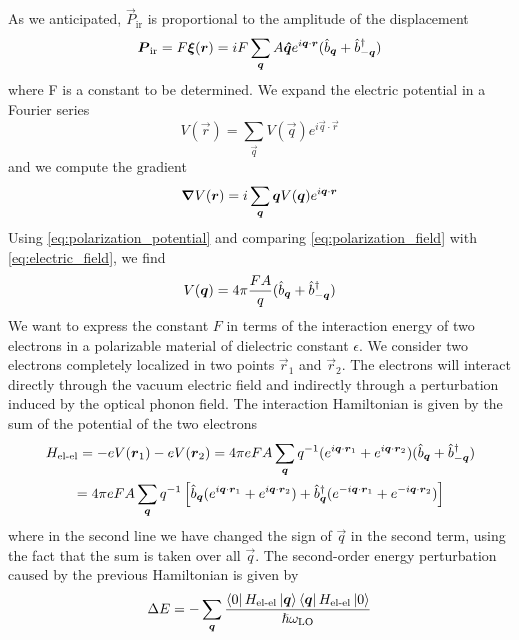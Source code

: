 As we anticipated, $\vec{P}_\text{ir}$ is proportional to the amplitude of the displacement
\begin{equation} \label{eq:polarization_field}
    \mathbf{\boldsymbol{P}}_\text{ir} = F \mathbf{\boldsymbol{\xi}}(\mathbf{\boldsymbol{r}}) = i F \sum_{\mathbf{\boldsymbol{q}}} A \mathbf{\boldsymbol{\hat{q}}} e^{i\mathbf{\boldsymbol{q}} \cdot \mathbf{\boldsymbol{r}}} (\hat{b}_{\mathbf{\boldsymbol{q}}} + \hat{b}^\dagger_{-\mathbf{\boldsymbol{q}}})
\end{equation}
where F is a constant to be determined. We expand the electric potential in a Fourier series
\begin{equation}
    V(\vec{r}) = \sum_\vec{q} V(\vec{q}) e^{i\vec{q} \cdot \vec{r}}
\end{equation}
and we compute the gradient
\begin{equation} \label{eq:electric_field}
    \grad V(\mathbf{\boldsymbol{r}}) = i \sum_{\mathbf{\boldsymbol{q}}} \mathbf{\boldsymbol{q}} V(\mathbf{\boldsymbol{q}}) e^{i\mathbf{\boldsymbol{q}} \cdot \mathbf{\boldsymbol{r}}}
\end{equation}
Using \cref{eq:polarization_potential} and comparing \cref{eq:polarization_field} with \cref{eq:electric_field}, we find
\begin{equation}
    V(\mathbf{\boldsymbol{q}}) = 4\pi \frac{F A}{q} (\hat{b}_{\mathbf{\boldsymbol{q}}} + \hat{b}^\dagger_{-\mathbf{\boldsymbol{q}}})
\end{equation}
We want to express the constant $F$ in terms of the interaction energy of two electrons in a polarizable material of dielectric constant $\epsilon$. We consider two electrons completely localized in two points $\vec{r}_1$ and $\vec{r}_2$. The electrons will interact directly through the vacuum electric field and indirectly through a perturbation induced by the optical phonon field. The interaction Hamiltonian is given by the sum of the potential of the two electrons
\begin{multline} \label{eq:hamiltonian_coulomb_medium}
    H_\text{el-el} = -e V(\mathbf{\boldsymbol{r}}_1) -e V(\mathbf{\boldsymbol{r}}_2)
    = 4\pi e F A \sum_{\mathbf{\boldsymbol{q}}} q^{-1} (e^{i\mathbf{\boldsymbol{q}} \cdot \mathbf{\boldsymbol{r}}_1} + e^{i\mathbf{\boldsymbol{q}} \cdot \mathbf{\boldsymbol{r}}_2} ) (\hat{b}_{\mathbf{\boldsymbol{q}}} + \hat{b}^\dagger_{-\mathbf{\boldsymbol{q}}})
    \\ = 4\pi e F A \sum_{\mathbf{\boldsymbol{q}}} q^{-1} \left[ \hat{b}_{\mathbf{\boldsymbol{q}}} (e^{i\mathbf{\boldsymbol{q}} \cdot \mathbf{\boldsymbol{r}}_1} + e^{i\mathbf{\boldsymbol{q}} \cdot \mathbf{\boldsymbol{r}}_2} )   + \hat{b}^\dagger_{\mathbf{\boldsymbol{q}}} (e^{-i\mathbf{\boldsymbol{q}} \cdot \mathbf{\boldsymbol{r}}_1} + e^{-i\mathbf{\boldsymbol{q}} \cdot \mathbf{\boldsymbol{r}}_2} )\right]
\end{multline}
where in the second line we have changed the sign of $\vec{q}$ in the second term, using the fact that the sum is taken over all $\vec{q}$. The second-order energy perturbation caused by the previous Hamiltonian is given by
\begin{equation}
    \Delta E = -\sum_{\mathbf{\boldsymbol{q}}} \frac{\bra{0}H_\text{el-el}\ket{\mathbf{\boldsymbol{q}}}\bra{\mathbf{\boldsymbol{q}}}H_\text{el-el}\ket{0}}{\hslash\omega_\text{LO}}
\end{equation}
